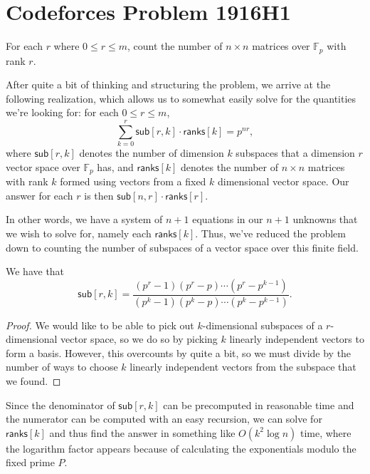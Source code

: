 \documentclass[a4paper, 12pt]{article}
\begin{document}
\section*{Codeforces Problem 1916H1}

\begin{sidebox}
    \begin{problem}
        For each \( r \) where \( 0 \le r \le m \), count the number of \( n \times n \) matrices over \( \mathbb{F}_p \) with rank \( r \).
    \end{problem}
\end{sidebox}

\begin{solution}
    After quite a bit of thinking and structuring the problem, we arrive at the following realization, which allows us to somewhat easily solve for the quantities we're looking for: for each \( 0 \le r \le m \),
    \[
        \sum_{k = 0}^{r} \textsf{sub}[r, k] \cdot \textsf{ranks}[k] = p^{nr}
    ,\]
    where \( \textsf{sub}[r, k] \) denotes the number of dimension \( k \) subspaces that a dimension \( r \) vector space over \( \mathbb{F}_p \) has, and \( \textsf{ranks}[k] \) denotes the number of \( n \times n \) matrices with rank \( k \) formed using vectors from a fixed \( k \) dimensional vector space. Our answer for each \( r \) is then \( \textsf{sub}[n, r] \cdot \textsf{ranks}[r] \).

    In other words, we have a system of \( n + 1 \) equations in our \( n + 1 \) unknowns that we wish to solve for, namely each \( \textsf{ranks}[k] \). Thus, we've reduced the problem down to counting the number of subspaces of a vector space over this finite field.

    \begin{claim}
        We have that
        \[
            \textsf{sub}[r, k] = \frac{(p^r - 1)(p^r - p) \cdots (p^r - p^{k - 1})}{(p^k - 1)(p^k - p) \cdots (p^k - p^{k-1})}
        .\]
    \end{claim}

    \begin{proof}
        We would like to be able to pick out \( k \)-dimensional subspaces of a \( r \)-dimensional vector space, so we do so by picking \( k \) linearly independent vectors to form a basis. However, this overcounts by quite a bit, so we must divide by the number of ways to choose \( k \) linearly independent vectors from the subspace that we found.
    \end{proof}

    Since the denominator of \( \textsf{sub}[r, k] \) can be precomputed in reasonable time and the numerator can be computed with an easy recursion, we can solve for \( \textsf{ranks}[k] \) and thus find the answer in something like \( O(k^2 \log n) \) time, where the logarithm factor appears because of calculating the exponentials modulo the fixed prime \( P \).
\end{solution}
\end{document}
